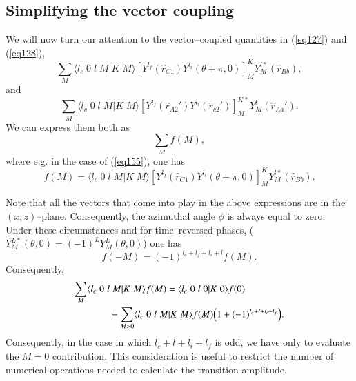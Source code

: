 \subsection{Simplifying the vector coupling}
We will now turn our attention to the vector--coupled quantities in (\ref{eq127}) and (\ref{eq128}),
\begin{equation}\label{eq155}
\sum_M \langle l_c \;0\;l\;M|K\;M\rangle \left[ Y ^{l_f} (\hat r_{C1}) Y ^{l_i} (\theta+\pi,0) \right] _{M}^{K}
 Y^{l*}_M (\hat r_{Bb}),
\end{equation}
and
\begin{equation}\label{eq156}
\sum_M \langle l_c \;0\;l\;M|K\;M\rangle \left[ Y ^{l_f} (\hat r_{A2}') Y ^{l_i} (\hat r_{c2}') \right] _{M}^{K*}
 Y^{l}_M (\hat r_{Aa}').
\end{equation}
We can express them both as
\begin{equation}\label{eq157}
\sum_M  f(M),
\end{equation}
where e.g. in the case of (\ref{eq155}), one has
\begin{equation}\label{eq158}
f(M)=\langle l_c \;0\;l\;M|K\;M\rangle \left[ Y ^{l_f} (\hat r_{C1}) Y ^{l_i} (\theta+\pi,0) \right] _{M}^{K}
 Y^{l*}_M (\hat r_{Bb}).
\end{equation}

Note that all the vectors that come into play in the above expressions are in the $(x,z)$--plane. Consequently, the azimuthal angle $\phi$ is always equal to zero. Under these circumstances and for time--reversed phases, ($Y^{L*}_M(\theta,0)=(-1)^LY^{L}_M(\theta,0)$) one has
\begin{equation}\label{eq164}
f(-M)=(-1)^{l_c+l_f+l_i+l}f(M).
\end{equation}
Consequently,
\begin{equation}\label{eq166}
\begin{split}
\sum_M \langle l_c \;0\;l&\;M|K\;M\rangle f(M)=\langle l_c \;0\;l\;0|K\;0\rangle f(0)\\
&+\sum_{M>0}\langle l_c \;0\;l\;M|K\;M\rangle f(M)\Bigl(1+(-1)^{l_c+l+l_i+l_f}\Bigr).
\end{split}
\end{equation}
Consequently, in the case in which $l_c+l+l_i+l_f$ is odd, we have only  to evaluate the $M=0$ contribution. This consideration is useful to restrict the number of numerical operations needed to calculate the transition amplitude.
